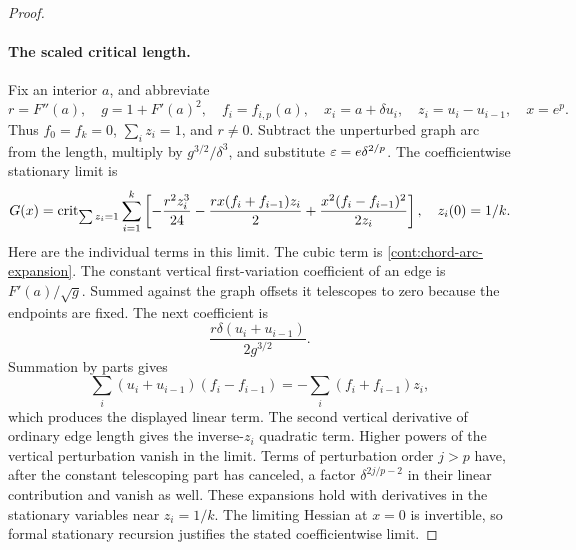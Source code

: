 \begin{proof}
\paragraph{The scaled critical length.}
Fix an interior \(a\), and abbreviate
\[
 r=F''(a),\quad g=1+F'(a)^2,\quad f_i=f_{i,p}(a),\quad
 x_i=a+\delta u_i,\quad z_i=u_i-u_{i-1},\quad x=e^p.
\]
Thus \(f_0=f_k=0\), \(\sum_i z_i=1\), and \(r\ne0\).
Subtract the unperturbed graph arc from the length, multiply
by \(g^{3/2}/\delta^3\), and substitute
\(\varepsilon=e\delta^{2/p}\).  The coefficientwise stationary
limit is
\begin{equation}
 G(x)=\operatorname{crit}_{\sum z_i=1}
 \sum_{i=1}^k\left[
 -\frac{r^2z_i^3}{24}
 -\frac{rx(f_i+f_{i-1})z_i}{2}
 +\frac{x^2(f_i-f_{i-1})^2}{2z_i}\right],
 \quad z_i(0)=1/k.
 \label{cont:point-limit-functional}
\end{equation}
Here are the individual terms in this limit.  The cubic
term is \eqref{cont:chord-arc-expansion}.  The constant
vertical first-variation coefficient of an edge is
\(F'(a)/\sqrt g\).  Summed against the graph offsets it
telescopes to zero because the endpoints are fixed.  The
next coefficient is
\[
 \frac{r\delta(u_i+u_{i-1})}{2g^{3/2}}.
\]
Summation by parts gives
\[
 \sum_i(u_i+u_{i-1})(f_i-f_{i-1})
       =-\sum_i(f_i+f_{i-1})z_i,
\]
which produces the displayed linear term.  The second
vertical derivative of ordinary edge length gives the
inverse-\(z_i\) quadratic term.  Higher powers of the
vertical perturbation vanish in the limit.  Terms of
perturbation order \(j>p\) have, after the constant
telescoping part has canceled, a factor
\(\delta^{2j/p-2}\) in their linear contribution and
vanish as well.  These expansions hold with derivatives
in the stationary variables near \(z_i=1/k\).  The limiting
Hessian at \(x=0\) is invertible, so formal stationary
recursion justifies the stated coefficientwise limit.


\end{proof}
